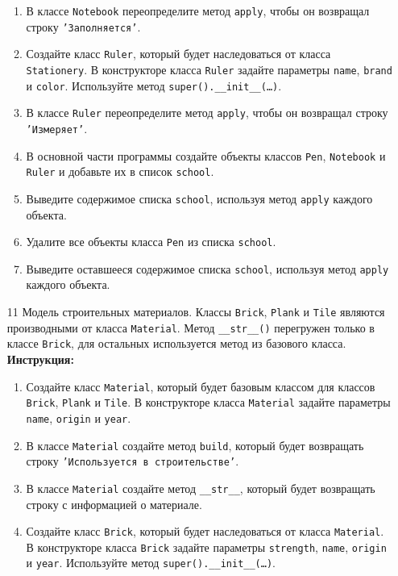 \begin{enumerate}
\begin{enumerate}
    \item В классе \texttt{Notebook} переопределите метод \texttt{apply}, чтобы он возвращал строку \texttt{'Заполняется'}.
    \item Создайте класс \texttt{Ruler}, который будет наследоваться от класса \texttt{Stationery}. В конструкторе класса \texttt{Ruler} задайте параметры \texttt{name}, \texttt{brand} и \texttt{color}. Используйте метод \texttt{super().\_\_init\_\_(\ldots)}.
    \item В классе \texttt{Ruler} переопределите метод \texttt{apply}, чтобы он возвращал строку \texttt{'Измеряет'}.
    \item В основной части программы создайте объекты классов \texttt{Pen}, \texttt{Notebook} и \texttt{Ruler} и добавьте их в список \texttt{school}.
    \item Выведите содержимое списка \texttt{school}, используя метод \texttt{apply} каждого объекта.
    \item Удалите все объекты класса \texttt{Pen} из списка \texttt{school}.
    \item Выведите оставшееся содержимое списка \texttt{school}, используя метод \texttt{apply} каждого объекта.
\end{enumerate}
\item[11]
Модель строительных материалов. Классы \texttt{Brick}, \texttt{Plank} и \texttt{Tile} являются производными от класса \texttt{Material}. Метод \texttt{\_\_str\_\_()} перегружен только в классе \texttt{Brick}, для остальных используется метод из базового класса.
\textbf{Инструкция:}
\begin{enumerate}
    \item Создайте класс \texttt{Material}, который будет базовым классом для классов \texttt{Brick}, \texttt{Plank} и \texttt{Tile}. В конструкторе класса \texttt{Material} задайте параметры \texttt{name}, \texttt{origin} и \texttt{year}.
    \item В классе \texttt{Material} создайте метод \texttt{build}, который будет возвращать строку \texttt{'Используется в строительстве'}.
    \item В классе \texttt{Material} создайте метод \texttt{\_\_str\_\_}, который будет возвращать строку с информацией о материале.
    \item Создайте класс \texttt{Brick}, который будет наследоваться от класса \texttt{Material}. В конструкторе класса \texttt{Brick} задайте параметры \texttt{strength}, \texttt{name}, \texttt{origin} и \texttt{year}. Используйте метод \texttt{super().\_\_init\_\_(\ldots)}.

\end{enumerate}
\end{enumerate}
